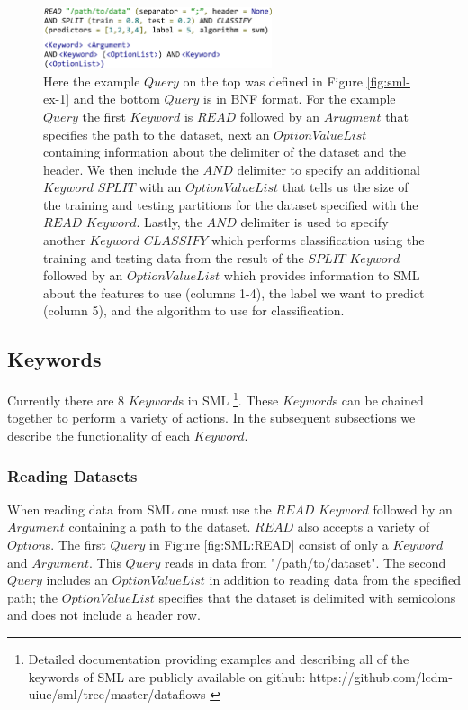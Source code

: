 \documentclass[jair,twoside,11pt,theapa]{article}
\begin{document}
\begin{figure}
\includegraphics[width=0.6\textwidth]{figs/bnf_ex.png}
\centering
\caption{Here the example \(Query\) on the top was defined in Figure \ref{fig:sml-ex-1} and the bottom \(Query\) is in BNF format. For the example \(Query\) the first \(Keyword\) is \(READ\) followed by an \(Arugment\) that specifies the path to the dataset, next an \(OptionValueList\) containing information about the delimiter of the dataset and the header. We then include the \(AND\) delimiter to specify an additional \(Keyword\) \(SPLIT\) with an \(OptionValueList\) that tells us the size of the training and testing partitions for the dataset specified with the \(READ\) \(Keyword\). Lastly, the \(AND\) delimiter is used to specify another \(Keyword\) \(CLASSIFY\) which performs classification using the training and testing data from the result of the  \(SPLIT\) \(Keyword\) followed by an \(OptionValueList\) which provides information  to SML about the features to use (columns 1-4), the label we want to predict (column 5), and the algorithm to use for classification.}
\label{fig:SML:BNFComp}
\end{figure}

\subsection{Keywords}
Currently there are 8 \(Keyword\)s in SML \footnote{Detailed documentation providing examples and describing all of the keywords of SML are publicly available on github: https://github.com/lcdm-uiuc/sml/tree/master/dataflows \label{SML:Dataflow}}. These \(Keyword\)s can be chained together to perform a variety of actions. In the subsequent subsections we describe the functionality of each \(Keyword\).

\subsubsection{Reading Datasets}
When reading data from SML one must use the \(READ\) \(Keyword\) followed by an \(Argument\) containing a path to the dataset. \(READ\) also accepts a variety of \(Option\)s. The first \(Query\) in Figure \ref{fig:SML:READ} consist of only a \(Keyword\) and \(Argument\). This \(Query\) reads in data from "/path/to/dataset". The second \(Query\) includes an \(OptionValueList\) in addition to reading data from the specified path; the \(OptionValueList\) specifies that the dataset is delimited with semicolons and does not include a header row. 
\end{document}

